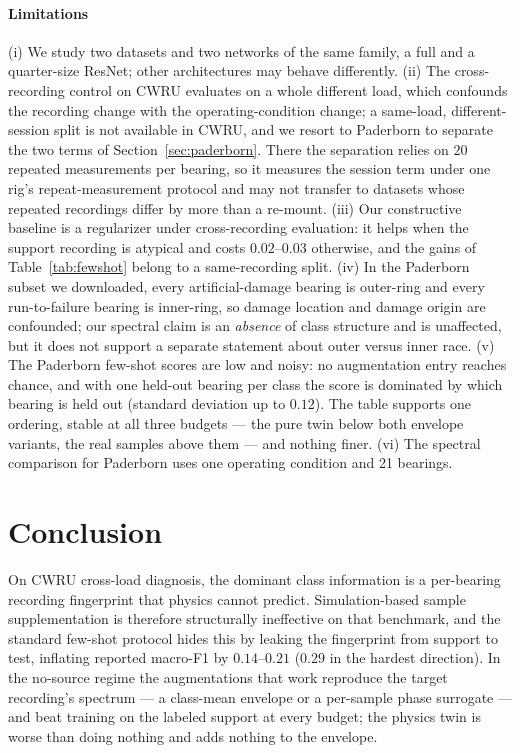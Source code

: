 \documentclass[journal]{IEEEtran}
\begin{document}
\paragraph{Limitations} (i) We study two datasets and two networks of the same
family, a full and a quarter-size ResNet; other architectures may behave
differently. (ii) The
cross-recording control on CWRU evaluates on a whole different load, which
confounds the recording change with the operating-condition change; a same-load,
different-session split is not available in CWRU, and we resort to Paderborn to
separate the two terms of Section~\ref{sec:paderborn}. There the separation
relies on $20$ repeated measurements per bearing, so it measures the session
term under one rig's repeat-measurement protocol and may not transfer to
datasets whose repeated recordings differ by more than a re-mount. (iii) Our
constructive baseline is a regularizer under cross-recording evaluation: it
helps when the support recording is atypical and costs $0.02$--$0.03$ otherwise,
and the gains of Table~\ref{tab:fewshot} belong to a same-recording split.
(iv) In the Paderborn subset we downloaded, every artificial-damage bearing is
outer-ring and every run-to-failure bearing is inner-ring, so damage location
and damage origin are confounded; our spectral claim is an \emph{absence} of
class structure and is unaffected, but it does not support a separate statement
about outer versus inner race. (v) The Paderborn few-shot scores are low and
noisy: no augmentation entry reaches chance, and with one held-out bearing per
class the score is dominated by which bearing is held out (standard deviation
up to $0.12$). The table supports one ordering, stable at all three budgets ---
the pure twin below both envelope variants, the real samples above them --- and
nothing finer. (vi) The spectral
comparison for Paderborn uses one operating condition and 21 bearings.

\section{Conclusion}
\label{sec:conclusion}

On CWRU cross-load diagnosis, the dominant class information is a per-bearing
recording fingerprint that physics cannot predict. Simulation-based sample
supplementation is therefore structurally ineffective on that benchmark, and
the standard few-shot protocol hides this by leaking the fingerprint from
support to test, inflating reported macro-F1 by $0.14$--$0.21$ ($0.29$ in the
hardest direction). In the no-source regime the augmentations that work
reproduce the target recording's spectrum --- a class-mean envelope or a
per-sample phase surrogate --- and beat training on the labeled support at
every budget; the physics twin is worse than doing nothing and adds nothing to
the envelope.
\end{document}
